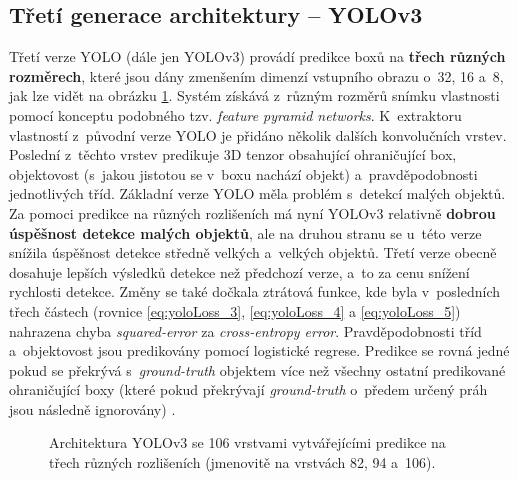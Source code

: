 \subsection*{Třetí generace architektury -- YOLOv3}
\label{yolov3Teorie}
Třetí verze YOLO (dále jen YOLOv3) provádí predikce boxů na \textbf{třech různých rozměrech}, které jsou dány zmenšením dimenzí vstupního obrazu o~32, 16 a~8, jak lze vidět na obrázku \ref{fig:YOLOv3}. Systém získává z~různým rozměrů snímku vlastnosti pomocí konceptu podobného tzv. \emph{feature pyramid networks}. K~extraktoru vlastností z~původní verze YOLO je přidáno několik dalších konvolučních vrstev. Poslední z~těchto vrstev predikuje 3D tenzor obsahující ohraničující box, objektovost (s~jakou jistotou se v~boxu nachází objekt) a~pravděpodobnosti jednotlivých tříd. Základní verze YOLO měla problém s~detekcí malých objektů. Za pomoci predikce na různých rozlišeních má nyní YOLOv3 relativně \textbf{dobrou úspěšnost detekce malých objektů}, ale na druhou stranu se u~této verze snížila úspěšnost detekce středně velkých a~velkých objektů. Třetí verze obecně dosahuje lepších výsledků detekce než předchozí verze, a~to za cenu snížení rychlosti detekce. Změny se také dočkala ztrátová funkce, kde byla v~posledních třech částech (rovnice \eqref{eq:yoloLoss_3}, \eqref{eq:yoloLoss_4} a \eqref{eq:yoloLoss_5}) nahrazena chyba \emph{squared-error} za \emph{cross-entropy error}. Pravděpodobnosti tříd a~objektovost jsou predikovány pomocí logistické regrese. Predikce se rovná jedné pokud se překrývá s~\emph{ground-truth} objektem více než všechny ostatní predikované ohraničující boxy (které pokud překrývají \emph{ground-truth} o~předem určený práh jsou následně ignorovány) \cite{yolov3,yolov3_article}.

\begin{figure}[H]
    \centering
    \caption{Architektura YOLOv3 se 106 vrstvami vytvářejícími predikce na třech různých rozlišeních (jmenovitě na vrstvách 82, 94 a~106).\footnotemark}
    \label{fig:YOLOv3}
\end{figure}

